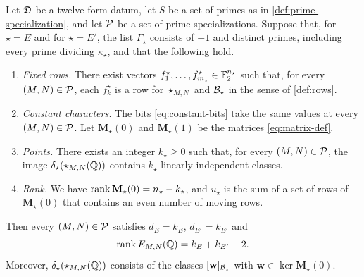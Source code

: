 \begin{proposition}\label{prop:rank-criterion}
Let $\mathfrak D$ be a twelve-form datum, let $S$ be a set of primes as in \cref{def:prime-specialization}, and let $\mathcal P$ be a set of prime specializations. Suppose that, for $\star=E$ and for $\star=E'$, the list $\Gamma_\star$ consists of $-1$ and distinct primes, including every prime dividing $\kappa_\star$, and that the following hold.
\begin{enumerate}[label=(\roman*),ref=(\roman*)]
\item\label{item:crit-fixed} \emph{Fixed rows.} There exist vectors $f^\star_1,\dots,f^\star_{m_\star}\in\mathbb F_2^{n_\star}$ such that, for every $(M,N)\in\mathcal P$, each $f^\star_k$ is a row for $\star_{M,N}$ and $\mathcal B_\star$ in the sense of \cref{def:rows}.
\item\label{item:crit-characters} \emph{Constant characters.} The bits \eqref{eq:constant-bits} take the same values at every $(M,N)\in\mathcal P$. Let $\mathbf M_\star(0)$ and $\mathbf M_\star(1)$ be the matrices \eqref{eq:matrix-def}.
\item\label{item:crit-points} \emph{Points.} There exists an integer $k_\star\ge0$ such that, for every $(M,N)\in\mathcal P$, the image $\delta_\star(\star_{M,N}(\mathbb Q))$ contains $k_\star$ linearly independent classes.
\item\label{item:crit-rank} \emph{Rank.} We have $\operatorname{rank}\mathbf M_\star(0)=n_\star-k_\star$, and $u_\star$ is the sum of a set of rows of $\mathbf M_\star(0)$ that contains an even number of moving rows.
\end{enumerate}
Then every $(M,N)\in\mathcal P$ satisfies $d_E=k_E$, $d_{E'}=k_{E'}$ and
\begin{equation}\label{eq:rank-criterion}
\operatorname{rank} E_{M,N}(\mathbb Q)=k_E+k_{E'}-2.
\end{equation}
Moreover, $\delta_\star(\star_{M,N}(\mathbb Q))$ consists of the classes $[\mathbf w]_{\mathcal B_\star}$ with $\mathbf w\in\ker\mathbf M_\star(0)$.
\end{proposition}

